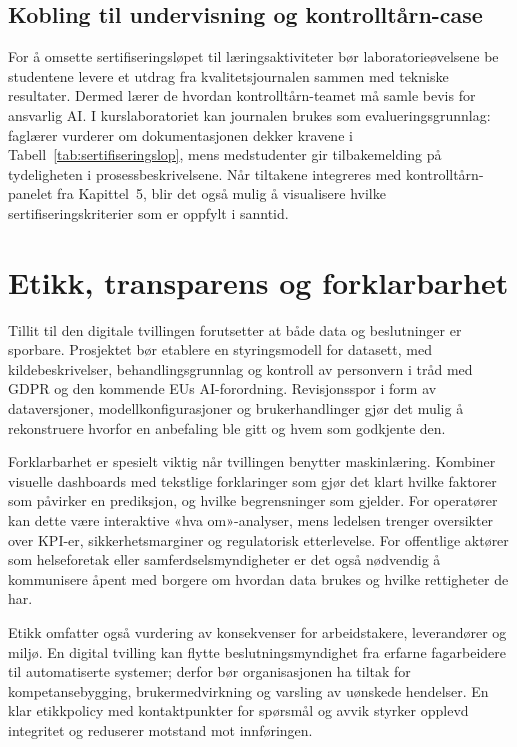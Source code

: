 \subsection{Kobling til undervisning og kontrolltårn-case}
For å omsette sertifiseringsløpet til læringsaktiviteter bør laboratorieøvelsene be studentene levere et utdrag fra kvalitetsjournalen sammen med tekniske resultater. Dermed lærer de hvordan kontrolltårn-teamet må samle bevis for ansvarlig AI. I kurslaboratoriet kan journalen brukes som evalueringsgrunnlag: faglærer vurderer om dokumentasjonen dekker kravene i Tabell~\ref{tab:sertifiseringslop}, mens medstudenter gir tilbakemelding på tydeligheten i prosessbeskrivelsene. Når tiltakene integreres med kontrolltårn-panelet fra Kapittel~5, blir det også mulig å visualisere hvilke sertifiseringskriterier som er oppfylt i sanntid.

\section{Etikk, transparens og forklarbarhet}
Tillit til den digitale tvillingen forutsetter at både data og beslutninger er sporbare. Prosjektet bør etablere en styringsmodell for datasett, med kildebeskrivelser, behandlingsgrunnlag og kontroll av personvern i tråd med GDPR og den kommende EUs AI-forordning. Revisjonsspor i form av dataversjoner, modellkonfigurasjoner og brukerhandlinger gjør det mulig å rekonstruere hvorfor en anbefaling ble gitt og hvem som godkjente den.

Forklarbarhet er spesielt viktig når tvillingen benytter maskinlæring. Kombiner visuelle dashboards med tekstlige forklaringer som gjør det klart hvilke faktorer som påvirker en prediksjon, og hvilke begrensninger som gjelder. For operatører kan dette være interaktive «hva om»-analyser, mens ledelsen trenger oversikter over KPI-er, sikkerhetsmarginer og regulatorisk etterlevelse. For offentlige aktører som helseforetak eller samferdselsmyndigheter er det også nødvendig å kommunisere åpent med borgere om hvordan data brukes og hvilke rettigheter de har.

Etikk omfatter også vurdering av konsekvenser for arbeidstakere, leverandører og miljø. En digital tvilling kan flytte beslutningsmyndighet fra erfarne fagarbeidere til automatiserte systemer; derfor bør organisasjonen ha tiltak for kompetansebygging, brukermedvirkning og varsling av uønskede hendelser. En klar etikkpolicy med kontaktpunkter for spørsmål og avvik styrker opplevd integritet og reduserer motstand mot innføringen.

